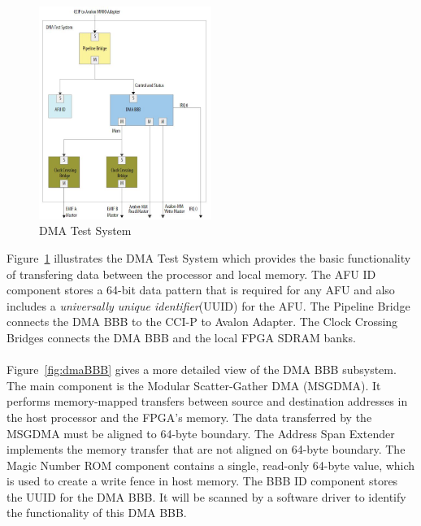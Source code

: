\documentclass[epsfig,10pt,fullpage]{article}
\begin{document}
\begin{figure}[h]
    \centering
    \includegraphics[width=0.5\textwidth]{figures/DMATestSystem.JPG}
    \caption{DMA Test System}
    \label{fig:dmaSystem}
\end{figure}

\noindent
Figure~\ref{fig:dmaSystem} illustrates the DMA Test System which provides the basic functionality of transfering data between the processor and local memory. The AFU ID component stores a 64-bit data pattern that is required for any AFU and also includes a {\it universally unique identifier}(UUID) for the AFU. The Pipeline Bridge connects the DMA BBB to the CCI-P to Avalon Adapter. The Clock Crossing Bridges connects the DMA BBB and the local FPGA SDRAM banks.\\ 
\\
Figure~\ref{fig:dmaBBB} gives a more detailed view of the DMA BBB subsystem. The main component is the Modular Scatter-Gather DMA (MSGDMA). It performs memory-mapped transfers between source and destination addresses in the host processor and the FPGA's memory. The data transferred by the MSGDMA must be aligned to 64-byte boundary. The Address Span Extender implements the memory transfer that are not aligned on 64-byte boundary. The Magic Number ROM component contains a single, read-only 64-byte value, which is used to create a write fence in host memory. The BBB ID component stores the UUID for the DMA BBB. It will be scanned by a software driver to identify the functionality of this DMA BBB.\\
\end{document}
